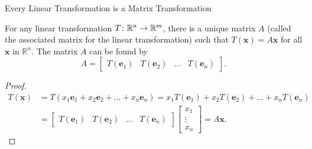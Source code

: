 \documentclass[xcolor=dvipsnames,aspectratio=169,t]{beamer}
\begin{document}
\begin{frame}{Every Linear Transformation is a Matrix Transformation}

\begin{theorem}
For any linear transformation $T\colon\mathbb{R}^n \to \mathbb{R}^m$, there is a unique matrix $A$ (called the \alert{associated matrix for the linear transformation}) such that $T(\mathbf{x}) = A \mathbf{x}$ for all $\mathbf{x}$ in $\mathbb{R}^n$.  The matrix $A$ can be found by
\[ A = \begin{bmatrix} T\left(\mathbf{e}_1 \right) & T\left(\mathbf{e}_2 \right) & \ldots & T\left(\mathbf{e}_n \right) \end{bmatrix}.\]

\end{theorem}

  \pause
  \begin{proof}
  \begin{align*}
  T(\mathbf{x}) &= T \left( x_1 \mathbf{e}_1 + x_2 \mathbf{e}_2 + \ldots + x_n \mathbf{e}_n \right) 
  = x_1 T \left( \mathbf{e}_1 \right) + x_2 T \left( \mathbf{e}_2 \right) + \ldots + x_n T \left( \mathbf{e}_n \right) \\
  &= \begin{bmatrix}  T \left( \mathbf{e}_1 \right)  & T \left( \mathbf{e}_2 \right) & \ldots & T \left( \mathbf{e}_n \right) \end{bmatrix} \begin{bmatrix} x_1 \\  \vdots \\ x_n \end{bmatrix} 
  = A \mathbf{x}.
  \end{align*}
  \end{proof}
\end{frame}
\end{document}
